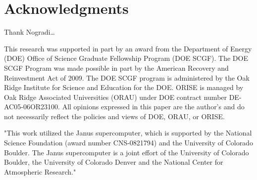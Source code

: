 \documentclass{PoS}
\begin{document}
\section{Acknowledgments}
Thank Nogradi\dots

This research was supported in part by an award from the Department of Energy (DOE) Office of Science Graduate Fellowship Program (DOE SCGF).
The DOE SCGF Program was made possible in part by the American Recovery and Reinvestment Act of 2009.
The DOE SCGF program is administered by the Oak Ridge Institute for Science and Education for the DOE.
ORISE is managed by Oak Ridge Associated Universities (ORAU) under DOE contract number DE-AC05-06OR23100.
All opinions expressed in this paper are the author's and do not necessarily reflect the policies and views of DOE, ORAU, or ORISE.

"This work utilized the Janus supercomputer, which is supported by the National Science Foundation (award number CNS-0821794) and the University of Colorado Boulder.
The Janus supercomputer is a joint effort of the University of Colorado Boulder, the University of Colorado Denver and the National Center for Atmospheric Research."
\end{document}
